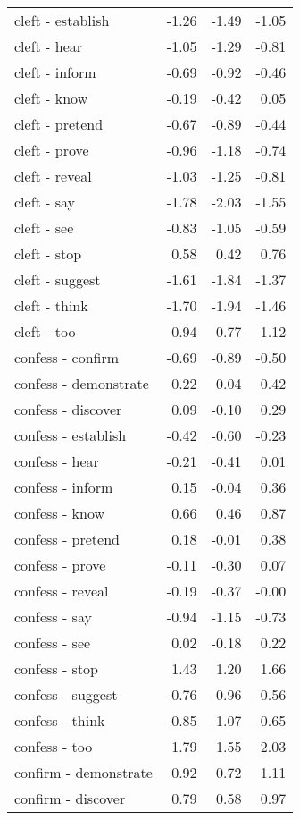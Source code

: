 \begin{longtable}{lrrr}
  cleft - establish & -1.26 & -1.49 & -1.05 \\ 
  cleft - hear & -1.05 & -1.29 & -0.81 \\ 
  cleft - inform & -0.69 & -0.92 & -0.46 \\ 
  cleft - know & -0.19 & -0.42 & 0.05 \\ 
  cleft - pretend & -0.67 & -0.89 & -0.44 \\ 
  cleft - prove & -0.96 & -1.18 & -0.74 \\ 
  cleft - reveal & -1.03 & -1.25 & -0.81 \\ 
  cleft - say & -1.78 & -2.03 & -1.55 \\ 
  cleft - see & -0.83 & -1.05 & -0.59 \\ 
  cleft - stop & 0.58 & 0.42 & 0.76 \\ 
  cleft - suggest & -1.61 & -1.84 & -1.37 \\ 
  cleft - think & -1.70 & -1.94 & -1.46 \\ 
  cleft - too & 0.94 & 0.77 & 1.12 \\ 
  confess - confirm & -0.69 & -0.89 & -0.50 \\ 
  confess - demonstrate & 0.22 & 0.04 & 0.42 \\ 
  confess - discover & 0.09 & -0.10 & 0.29 \\ 
  confess - establish & -0.42 & -0.60 & -0.23 \\ 
  confess - hear & -0.21 & -0.41 & 0.01 \\ 
  confess - inform & 0.15 & -0.04 & 0.36 \\ 
  confess - know & 0.66 & 0.46 & 0.87 \\ 
  confess - pretend & 0.18 & -0.01 & 0.38 \\ 
  confess - prove & -0.11 & -0.30 & 0.07 \\ 
  confess - reveal & -0.19 & -0.37 & -0.00 \\ 
  confess - say & -0.94 & -1.15 & -0.73 \\ 
  confess - see & 0.02 & -0.18 & 0.22 \\ 
  confess - stop & 1.43 & 1.20 & 1.66 \\ 
  confess - suggest & -0.76 & -0.96 & -0.56 \\ 
  confess - think & -0.85 & -1.07 & -0.65 \\ 
  confess - too & 1.79 & 1.55 & 2.03 \\ 
  confirm - demonstrate & 0.92 & 0.72 & 1.11 \\ 
  confirm - discover & 0.79 & 0.58 & 0.97 \\ 

\end{longtable}

